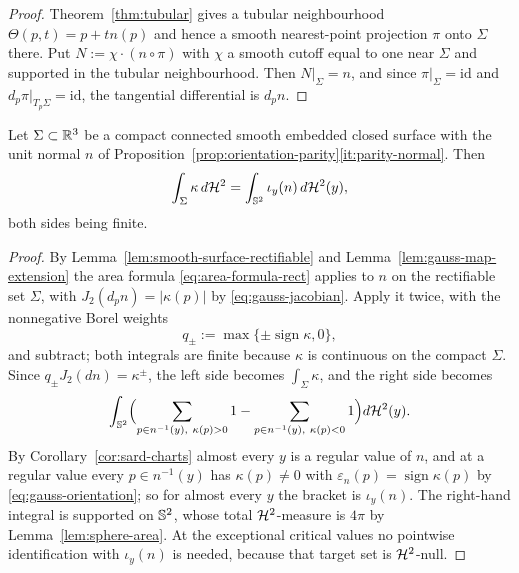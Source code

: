 \begin{proof}
Theorem~\ref{thm:tubular} gives a tubular neighbourhood
$\Theta(p,t)=p+tn(p)$ and hence a smooth nearest-point projection
$\pi$ onto $\Sigma$ there.  Put $N:=\chi\cdot(n\circ\pi)$ with $\chi$ a smooth
cutoff equal to one near $\Sigma$ and supported in the tubular neighbourhood.
Then $N|_\Sigma=n$, and since $\pi|_\Sigma=\mathrm{id}$ and
$d_p\pi|_{T_p\Sigma}=\mathrm{id}$, the tangential differential is $d_pn$.
\end{proof}

\begin{theorem}
\label{thm:total-curvature-index}
Let $\Sigma\subset\mathbb R^3$ be a compact connected smooth embedded closed surface
with the unit normal $n$ of
Proposition~\ref{prop:orientation-parity}\ref{it:parity-normal}.  Then
\begin{equation}\label{eq:total-curvature-index}
  \int_\Sigma\kappa\,d\mathcal H^2=\int_{\mathbb S^2}\iota_y(n)\,d\mathcal H^2(y),
\end{equation}
both sides being finite.
\end{theorem}

\begin{proof}
By Lemma~\ref{lem:smooth-surface-rectifiable} and
Lemma~\ref{lem:gauss-map-extension} the area formula
\eqref{eq:area-formula-rect} applies to $n$ on the rectifiable set $\Sigma$,
with $J_2(d_pn)=|\kappa(p)|$ by \eqref{eq:gauss-jacobian}.  Apply it twice,
with the nonnegative Borel weights
\[
  q_\pm:=\max\{\pm\operatorname{sign}\kappa,0\},
\]
and subtract; both integrals are finite because $\kappa$ is continuous on the
compact $\Sigma$.  Since $q_\pm J_2(dn)=\kappa^\pm$, the left side becomes
$\int_\Sigma\kappa$, and the right side becomes
\[
  \int_{\Sph^2}\Bigl(\sum_{p\in n^{-1}(y),\ \kappa(p)>0}1
    -\sum_{p\in n^{-1}(y),\ \kappa(p)<0}1\Bigr)d\Hs^2(y).
\]
By Corollary~\ref{cor:sard-charts} almost every $y$ is a regular value of $n$,
and at a regular value every $p\in n^{-1}(y)$ has $\kappa(p)\ne0$ with
$\varepsilon_n(p)=\operatorname{sign}\kappa(p)$ by
\eqref{eq:gauss-orientation}; so for almost every $y$ the bracket is
$\iota_y(n)$.  The right-hand integral is supported on $\mathbb S^2$, whose total
$\mathcal H^2$-measure is $4\pi$ by Lemma~\ref{lem:sphere-area}.  At the exceptional
critical values no pointwise identification with $\iota_y(n)$ is needed,
because that target set is $\mathcal H^2$-null.
\end{proof}

